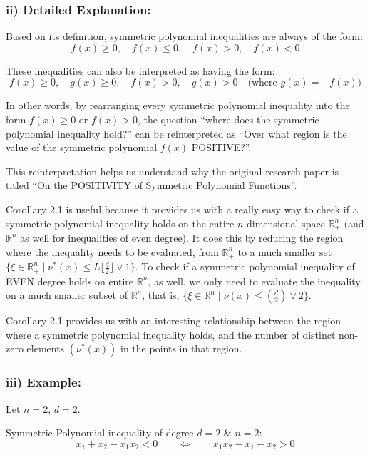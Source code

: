 \documentclass[12pt]{article}
\theoremstyle{definition}
\begin{document}
\subsubsection*{ii) Detailed Explanation:}

Based on its definition, symmetric polynomial inequalities are always of the form:
\[
f(x) \geq 0, \quad f(x) \leq 0, \quad f(x) > 0, \quad f(x) < 0
\]

These inequalities can also be interpreted as having the form:
\[
f(x) \geq 0, \quad g(x) \geq 0, \quad f(x) > 0, \quad g(x) > 0 \quad \text{(where } g(x) = -f(x)\text{)}
\]

In other words, by rearranging every symmetric polynomial inequality into the form $f(x) \geq 0$ or $f(x) > 0$, the question ``where does the symmetric polynomial inequality hold?'' can be reinterpreted as ``Over what region is the value of the symmetric polynomial $f(x)$ POSITIVE?''.

This reinterpretation helps us understand why the original research paper is titled ``On the POSITIVITY of Symmetric Polynomial Functions''.

Corollary 2.1 is useful because it provides us with a really easy way to check if a symmetric polynomial inequality holds on the entire $n$-dimensional space $\mathbb{R}_+^n$ (and $\mathbb{R}^n$ as well for inequalities of even degree). It does this by reducing the region where the inequality needs to be evaluated, from $\mathbb{R}_+^n$ to a much smaller set $\{\xi \in \mathbb{R}_+^n \mid \nu^*(x) \leq L\lfloor \frac{d}{2} \rfloor \vee 1\}$. To check if a symmetric polynomial inequality of EVEN degree holds on entire $\mathbb{R}^n$, as well, we only need to evaluate the inequality on a much smaller subset of $\mathbb{R}^n$, that is, $\{\xi \in \mathbb{R}^n \mid \nu(x) \leq (\frac{d}{2}) \vee 2\}$.

Corollary 2.1 provides us with an interesting relationship between the region where a symmetric polynomial inequality holds, and the number of distinct non-zero elements $(\nu^*(x))$ in the points in that region.

\subsubsection*{iii) Example:}

Let $n = 2$, $d = 2$.

Symmetric Polynomial inequality of degree $d = 2$ \& $n = 2$:
\[
x_1 + x_2 - x_1x_2 < 0 \qquad \Longleftrightarrow \qquad x_1x_2 - x_1 - x_2 > 0
\]
\end{document}
